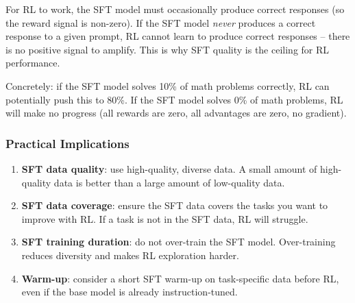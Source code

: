 \begin{intuitionbox}
For RL to work, the SFT model must occasionally produce correct responses (so the reward signal is non-zero). If the SFT model \emph{never} produces a correct response to a given prompt, RL cannot learn to produce correct responses -- there is no positive signal to amplify. This is why SFT quality is the ceiling for RL performance.

Concretely: if the SFT model solves 10\% of math problems correctly, RL can potentially push this to 80\%. If the SFT model solves 0\% of math problems, RL will make no progress (all rewards are zero, all advantages are zero, no gradient).
\end{intuitionbox}

\subsubsection*{Practical Implications}
\label{practical-implications}

\begin{enumerate}
  \item \textbf{SFT data quality}: use high-quality, diverse data. A small amount of high-quality data is better than a large amount of low-quality data.
  \item \textbf{SFT data coverage}: ensure the SFT data covers the tasks you want to improve with RL. If a task is not in the SFT data, RL will struggle.
  \item \textbf{SFT training duration}: do not over-train the SFT model. Over-training reduces diversity and makes RL exploration harder.
  \item \textbf{Warm-up}: consider a short SFT warm-up on task-specific data before RL, even if the base model is already instruction-tuned.
\end{enumerate}

